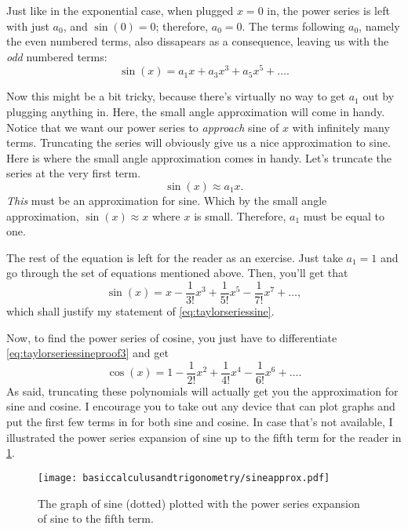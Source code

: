 Just like in the exponential case, when plugged $x = 0$ in, the power series is left with just $a_0$, and $\sin(0) = 0$; therefore, $a_0 = 0$. The terms following $a_0$, namely the even numbered terms, also dissapears as a consequence, leaving us with the \emph{odd} numbered terms:
\begin{equation*}
    \sin(x) = a_1x + a_3x^3 + a_5x^5 + \dots.
\end{equation*}

Now this might be a bit tricky, because there's virtually no way to get $a_1$ out by plugging anything in. Here, the small angle approximation will come in handy. Notice that we want our power series to \emph{approach} sine of $x$ with infinitely many terms. Truncating the series will obviously give us a nice approximation to sine. Here is where the small angle approximation comes in handy. Let's truncate the series at the very first term.
\begin{equation*}
    \sin(x) \approx a_1x.
\end{equation*}
\emph{This} must be an approximation for sine. Which by the small angle approximation, $\sin(x) \approx x$ where $x$ is small. Therefore, $a_1$ must be equal to one.

The rest of the equation is left for the reader as an exercise. Just take $a_1 = 1$ and go through the set of equations mentioned above. Then, you'll get that
\begin{equation}
    \sin(x) = x - \frac{1}{3!}x^3 + \frac{1}{5!}x^5 - \frac{1}{7!}x^7 + \dots, \label{eq:taylorseriessineproof3}
\end{equation}
which shall justify my statement of \cref{eq:taylorseriessine}.

Now, to find the power series of cosine, you just have to differentiate \cref{eq:taylorseriessineproof3} and get
\begin{equation*}
    \cos(x) = 1 - \frac{1}{2!}x^2 + \frac{1}{4!}x^4 - \frac{1}{6!}x^6 + \dots.
\end{equation*}
As said, truncating these polynomials will actually get you the approximation for sine and cosine. I encourage you to take out any device that can plot graphs and put the first few terms in for both sine and cosine. In case that's not available, I illustrated the power series expansion of sine up to the fifth term for the reader in \cref{fig:sineapprox}.

\begin{figure}
    \centering
    \texttt{[image: basiccalculusandtrigonometry/sineapprox.pdf]}
    \caption{The graph of sine (dotted) plotted with the power series expansion of sine to the fifth term.}
    \label{fig:sineapprox}
\end{figure}

